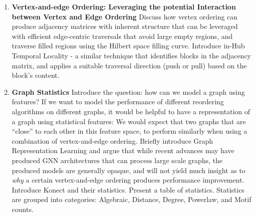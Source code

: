 \begin{enumerate}[label*=\arabic*.]
{                    how computing it is easily parallelizable, and why it produces an improvement in performance for (certain) graph algorithms.
              }
        \item{\textbf{Vertex-and-edge Ordering: Leveraging the potential Interaction between Vertex and Edge Ordering}
                    Discuss how vertex ordering can produce adjacency matrices with inherent structure that can be leveraged with efficient edge-centric traversals that avoid large empty regions, and traverse filled regions
                    using the Hilbert space filling curve. Introduce in-Hub Temporal Locality - a similar technique that identifies blocks in the adjacency matrix, and applies a suitable traversal direction (push or pull) based on the block's content.
              }
        \item{\textbf{Graph Statistics}
                    Introduce the question: how can we model a graph using features? If we want to model the performance of different reordering algorithms on different graphs, it would be helpful to have a representation of a graph using
                    statistical features: We would expect that two graphs that are ``close'' to each other in this feature space, to perform similarly when using a combination of vertex-and-edge ordering. Briefly introduce Graph Representation Learning and argue that while recent advances may have produced \ac{GNN} architectures that can process large scale graphs, the produced models are generally opaque, and will not yield much insight as to \textit{why} a certain
                    vertex-and-edge ordering produces performance improvement. Introduce Konect and their statistics. Present a table of statistics. Statistics are grouped into categories: Algebraic, Distance, Degree, Powerlaw, and Motif counts.
              }
\end{enumerate}


